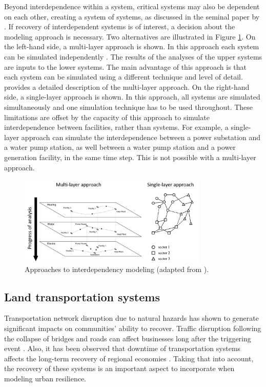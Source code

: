 Beyond interdependence within a system, critical systems may also be dependent on each other, creating a system of systems, as discussed in the seminal paper by \cite{rinaldi2001identifying}. If recovery of interdependent systems is of interest, a decision about the modeling approach is necessary. Two alternatives are illustrated in Figure \ref{fig:Interdependencies}. On the left-hand side, a multi-layer approach is shown. In this approach each system can be simulated independently \citep{guidotti2017multi}. The results of the analyses of the upper systems are inputs to the lower systems. The main advantage of this approach is that each system can be simulated using a different technique and level of detail. \cite[p.243] {cimellaro2016resilience} provides a detailed description of the multi-layer approach. On the right-hand side, a single-layer approach is shown. In this approach, all systems are simulated simultaneously and one simulation technique has to be used throughout. These limitations are offset by the capacity of this approach to simulate interdependence between facilities, rather than systems. For example, a single-layer approach can simulate the interdependence between a power substation and a water pump station, as well between a water pump station and a power generation facility, in the same time step. This is not possible with a multi-layer approach.\ 

\begin{figure}[htb]
    \centering
    \includegraphics[width=0.8\textwidth, angle = 0]{Figures/Interdependencies.png}
    \caption{Approaches to interdependency modeling (adapted from \cite{cimellaro2016resilience}).}
    \label{fig:Interdependencies}
\end{figure}

\subsection{Land transportation systems}
Transportation network disruption due to natural hazards has shown to generate significant impacts on communities' ability to recover. Traffic disruption following the collapse of bridges and roads can affect businesses long after the triggering event \citep{boarnet1998business}. Also, it has been observed that downtime of transportation systems affects the long-term recovery of regional economies \citep{chang2000transportation}. Taking that into account, the recovery of these systems is an important aspect to incorporate when modeling urban resilience. \

